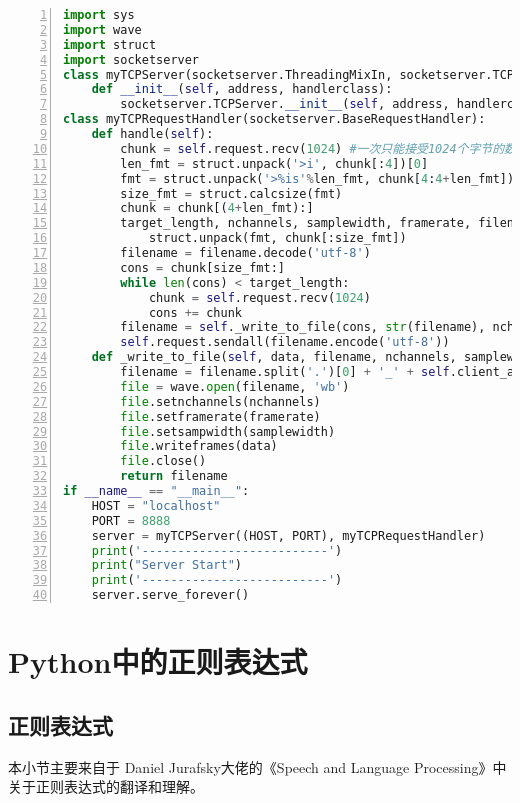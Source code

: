 \begin{lstlisting}[language = python, caption={音频传输的server端代码}, label={lst:sendsave-wave-server}, numbers=left, 
       numberstyle=\tiny,keywordstyle=\color{blue!70},
       commentstyle=\color{red!50!green!50!blue!50},frame=shadowbox,
       rulesepcolor=\color{red!20!green!20!blue!20},basicstyle=\ttfamily]
import sys
import wave
import struct
import socketserver
class myTCPServer(socketserver.ThreadingMixIn, socketserver.TCPServer):
    def __init__(self, address, handlerclass):
        socketserver.TCPServer.__init__(self, address, handlerclass)
class myTCPRequestHandler(socketserver.BaseRequestHandler):
    def handle(self):
        chunk = self.request.recv(1024) #一次只能接受1024个字节的数据，其他的会继续传过来
        len_fmt = struct.unpack('>i', chunk[:4])[0] 
        fmt = struct.unpack('>%is'%len_fmt, chunk[4:4+len_fmt])[0].decode('utf-8') 
        size_fmt = struct.calcsize(fmt)
        chunk = chunk[(4+len_fmt):]
        target_length, nchannels, samplewidth, framerate, filename = \
            struct.unpack(fmt, chunk[:size_fmt])
        filename = filename.decode('utf-8')
        cons = chunk[size_fmt:]
        while len(cons) < target_length:
            chunk = self.request.recv(1024)
            cons += chunk
        filename = self._write_to_file(cons, str(filename), nchannels, samplewidth, framerate)
        self.request.sendall(filename.encode('utf-8'))
    def _write_to_file(self, data, filename, nchannels, samplewidth, framerate):
        filename = filename.split('.')[0] + '_' + self.client_address[0] + '.wav'
        file = wave.open(filename, 'wb')
        file.setnchannels(nchannels)
        file.setframerate(framerate)
        file.setsampwidth(samplewidth)
        file.writeframes(data)
        file.close()
        return filename
if __name__ == "__main__":
    HOST = "localhost"
    PORT = 8888
    server = myTCPServer((HOST, PORT), myTCPRequestHandler)
    print('--------------------------')
    print("Server Start")
    print('--------------------------')
    server.serve_forever()
\end{lstlisting}

\section{Python中的正则表达式}
\subsection{正则表达式}
本小节主要来自于 Daniel Jurafsky大佬的《Speech and Language Processing》中关于正则表达式的翻译和理解。

